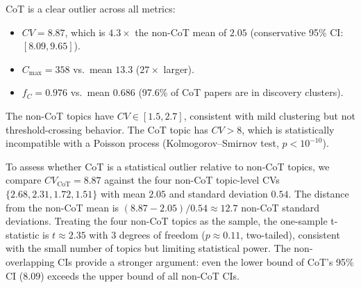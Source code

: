 \documentclass[12pt]{article}
\begin{document}
CoT is a clear outlier across all metrics:
\begin{itemize}
    \item $CV = 8.87$, which is $4.3\times$ the non-CoT mean of $2.05$ (conservative 95\% CI: $[8.09, 9.65]$).
    \item $C_{\max} = 358$ vs.\ mean $13.3$ ($27\times$ larger).
    \item $f_C = 0.976$ vs.\ mean $0.686$ (97.6\% of CoT papers are in discovery clusters).
\end{itemize}

The non-CoT topics have $CV \in [1.5, 2.7]$, consistent with mild clustering but not threshold-crossing behavior. The CoT topic has $CV > 8$, which is statistically incompatible with a Poisson process (Kolmogorov--Smirnov test, $p < 10^{-10}$).

To assess whether CoT is a statistical outlier relative to non-CoT topics, we compare $CV_{\mathrm{CoT}} = 8.87$ against the four non-CoT topic-level CVs $\{2.68, 2.31, 1.72, 1.51\}$ with mean $2.05$ and standard deviation $0.54$. The distance from the non-CoT mean is $(8.87 - 2.05)/0.54 \approx 12.7$ non-CoT standard deviations. Treating the four non-CoT topics as the sample, the one-sample t-statistic is $t \approx 2.35$ with 3 degrees of freedom ($p \approx 0.11$, two-tailed), consistent with the small number of topics but limiting statistical power. The non-overlapping CIs provide a stronger argument: even the lower bound of CoT's 95\% CI ($8.09$) exceeds the upper bound of all non-CoT CIs.
\end{document}
